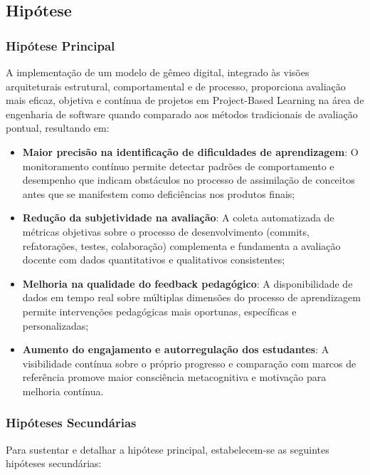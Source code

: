 \documentclass[12pt,a4paper]{article}
\begin{document}
\subsection{Hipótese}

\subsubsection{Hipótese Principal}

A implementação de um modelo de gêmeo digital,
integrado às visões arquiteturais estrutural, comportamental e de processo,
proporciona avaliação mais eficaz, objetiva e contínua de projetos em
Project-Based Learning na área de engenharia de software quando comparado aos
métodos tradicionais de avaliação pontual, resultando em:

\begin{itemize}
  \item \textbf{Maior precisão na identificação de dificuldades de aprendizagem}: O monitoramento contínuo permite detectar padrões de comportamento e desempenho que indicam obstáculos no processo de assimilação de conceitos antes que se manifestem como deficiências nos produtos finais;

  \item \textbf{Redução da subjetividade na avaliação}: A coleta automatizada de métricas objetivas sobre o processo de desenvolvimento (commits, refatorações, testes, colaboração) complementa e fundamenta a avaliação docente com dados quantitativos e qualitativos consistentes;

  \item \textbf{Melhoria na qualidade do feedback pedagógico}: A disponibilidade de dados em tempo real sobre múltiplas dimensões do processo de aprendizagem permite intervenções pedagógicas mais oportunas, específicas e personalizadas;

  \item \textbf{Aumento do engajamento e autorregulação dos estudantes}: A visibilidade contínua sobre o próprio progresso e comparação com marcos de referência promove maior consciência metacognitiva e motivação para melhoria contínua.
\end{itemize}

\subsubsection{Hipóteses Secundárias}

Para sustentar e detalhar a hipótese principal, estabelecem-se as seguintes
hipóteses secundárias:
\end{document}
